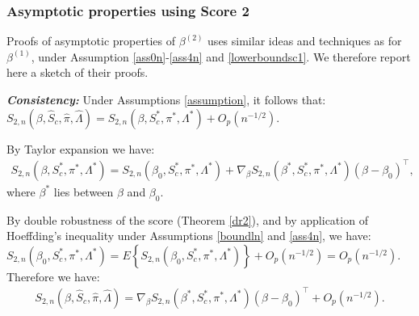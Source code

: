 \documentclass[11pt]{article}
\newcommand{\ee}{\end{eqnarray}}
\newcommand{\eqnn}{\begin{eqnarray*}}
\newcommand{\een}{\end{eqnarray*}}
\newcommand{\be}{\begin{eqnarray}}
\begin{document}

\newpage
\subsubsection{Asymptotic properties using Score 2}
Proofs of asymptotic properties of $\beta^{(2)}$
uses similar ideas and techniques as for $\beta^{(1)}$, 
under Assumption \ref{ass0n}-\ref{ass4n} and \ref{lowerboundsc1}. 
We therefore report here a sketch of their proofs.


\textbf{\emph{Consistency:}}
Under Assumptions \ref{assumption}, it follows that:
$
{S}_{2,n}({\beta}, \hat S_c, \hat \pi, \hat \Lambda)=S_{2,n}({\beta}, S^{*}_{c},  \pi^{*}, \Lambda^{*})+O_p(n^{-1/2}).
$

By Taylor expansion we have:
\eqnn
S_{2,n}({\beta}, S^{*}_{c},  \pi^{*}, \Lambda^{*})=S_{2,n}({\beta}_0, S^{*}_c,  \pi^{*}, \Lambda^{*})+\nabla_{{\beta}}S_{2,n}({\beta}^{*}, S^{*}_c,  \pi^{*}, \Lambda^{*})\left({\beta}-{\beta}_0\right)^\top,
\een
where ${\beta}^{*}$ lies between ${\beta}$ and ${\beta}_0$.

By double robustness of the score (Theorem \ref{dr2}), and by application of Hoeffding's inequality under Assumptions  \ref{boundln} and \ref{ass4n}, we have:
$
S_{2,n}({\beta}_0, S^{*}_c,  \pi^{*}, \Lambda^{*})=E\left\{S_{2,n}({\beta}_0, S^{*}_c,  \pi^{*}, \Lambda^{*})\right\}+O_p(n^{-1/2})=O_p(n^{-1/2}).
$
Therefore we have:
\be\label{decosc1n}
S_{2,n}({\beta}, \hat S_c, \hat \pi, \hat \Lambda)=\nabla_{{\beta}}S_{2,n}({\beta}^{*}, S^{*}_c,  \pi^{*}, \Lambda^{*})\left({\beta}-{\beta}_0\right)^\top + O_p(n^{-1/2}).
\ee
\end{document}
